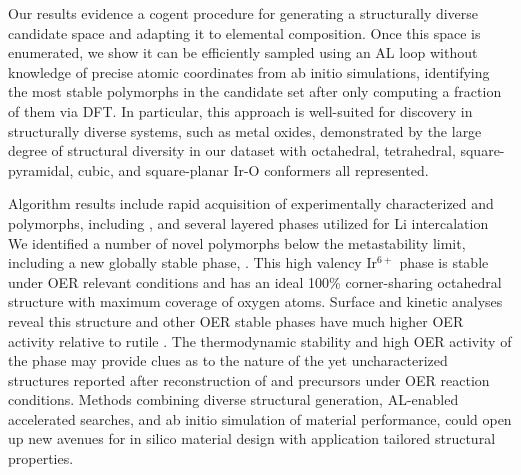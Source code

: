 


%
Our results evidence a cogent procedure for generating a structurally diverse candidate space and adapting it to elemental composition.
%
Once this space is enumerated, we show it can be efficiently sampled using an AL loop without knowledge of precise atomic coordinates from ab initio simulations, identifying the most stable polymorphs in the candidate set after only computing a fraction of them via DFT.
%
In particular, this approach is well-suited for discovery in structurally diverse systems, such as metal oxides, demonstrated by the large degree of structural diversity in our dataset with octahedral, tetrahedral,  square-pyramidal,  cubic,  and  square-planar Ir-O conformers all represented.


%
%
Algorithm results include rapid acquisition of experimentally characterized \IrOtwo and \IrOthree polymorphs, including \rIrOtwo, and several layered \IrOthree phases utilized for Li intercalation
%
We identified a number of novel \IrOthree polymorphs below the metastability limit, including a new globally stable phase, \aIrOthree.
%
This high valency Ir$^{6+}$ phase is stable under OER relevant conditions and has an ideal 100\% corner-sharing octahedral structure with maximum coverage of oxygen atoms.
%
Surface and kinetic analyses reveal this structure and other OER stable \IrOthree phases have much higher OER activity relative to rutile \IrOtwo.
%
The thermodynamic stability and high OER activity of the \aIrOthree phase may provide clues as to the nature of the yet uncharacterized structures reported after reconstruction of  and \IrOx precursors under OER reaction conditions.
%
Methods combining diverse structural generation, AL-enabled accelerated searches, and ab initio simulation of material performance, could open up new avenues for in silico material design with application tailored structural properties.







